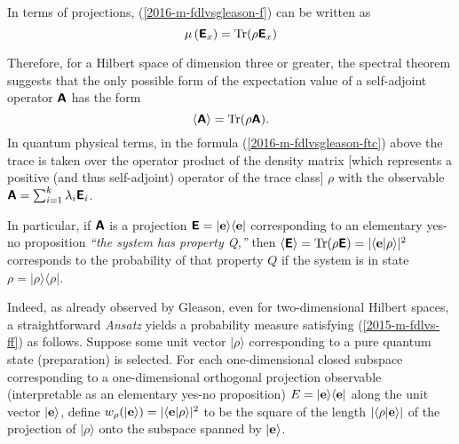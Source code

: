 In terms of projections,
(\ref{2016-m-fdlvsgleason-f}) can be written as
\begin{equation}
\mu \left( \textsf{\textbf{E}}_x \right)
=
{\rm Tr}( \rho  \textsf{\textbf{E}}_x )
\label{2016-m-fdlvsgleason-fproj}
\end{equation}



Therefore, for a Hilbert space of dimension three or greater, the  spectral theorem suggests that
the only possible form of the  expectation value
of a self-adjoint operator  $\textsf{\textbf{A}}$
has the form
\begin{equation}
\langle
\textsf{\textbf{A}}
\rangle
=
\textrm{Tr}({  \rho} \textsf{\textbf{A}}).
\label{2016-m-fdlvsgleason-ftc}
\end{equation}
In quantum physical terms, in the formula (\ref{2016-m-fdlvsgleason-ftc}) above
the trace is taken over
the operator product of the  density matrix [which represents a positive (and thus self-adjoint) operator of the trace class]
${  \rho}$
with the observable $\textsf{\textbf{A}}=\sum_{i=1}^k \lambda_i \textsf{\textbf{E}}_i $.

In particular, if $\textsf{\textbf{A}}$ is a projection $\textsf{\textbf{E}}= \vert {\bf e} \rangle \langle {\bf e} \vert$
corresponding to an elementary yes-no proposition
{\it ``the system has property Q,''} then $\langle \textsf{\textbf{E}}\rangle = \textrm{Tr}({  \rho}  \textsf{\textbf{E}})
=
\vert \langle {\bf e}\vert \rho \rangle \vert^2$ corresponds
to the probability of that property $Q$ if the system is in state $\rho= \vert \rho \rangle \langle \rho \vert$.


Indeed, as already observed by Gleason, even for two-dimensional Hilbert spaces, a straightforward {\it Ansatz}
yields a  probability measure satisfying (\ref{2015-m-fdlvs-ff}) as follows.
Suppose some unit vector $\vert \rho \rangle$ corresponding to a pure quantum state (preparation) is selected.
For each one-dimensional closed subspace corresponding
to a one-dimensional orthogonal projection observable (interpretable as an elementary yes-no proposition)
$E=\vert {\bf e}\rangle \langle {\bf e} \vert$
along the unit vector $\vert {\bf e}\rangle$,
define
$w_\rho(\vert {\bf e}\rangle ) =  \vert \langle {\bf e} \vert  \rho \rangle \vert^2$
to be the  square of the length $\vert \langle \rho \vert {\bf e} \rangle \vert$ of the
projection of $\vert \rho \rangle$ onto the subspace spanned by $\vert {\bf e}\rangle$.


\fi

